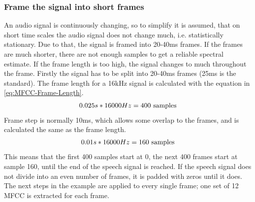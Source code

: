 \subsubsection{Frame the signal into short frames}
An audio signal is continuously changing, so to simplify it is assumed, that on short time scales the audio signal does not change much, i.e. statistically stationary. Due to that, the signal is framed into 20-40ms frames. If the frames are much shorter, there are not enough samples to get a reliable spectral estimate. If the frame length is too high, the signal changes to much throughout the frame.
\newline 
\newline
Firstly the signal has to be split into 20-40ms frames (25ms is the standard). The frame length for a 16kHz signal is calculated with the equation in \ref{eq:MFCC-Frame-Length}. 
\begin{equation}
    \centering
    0.025s * 16000Hz = 400 \ \text{samples}
    \label{eq:MFCC-Frame-Length}
\end{equation}
Frame step is normally 10ms, which allows some overlap to the frames, and is calculated the same as the frame length.
\begin{equation}
    \centering
    0.01s * 16000Hz = 160 \ \text{samples}
    \label{eq:MFCC-Frame-Step}
\end{equation}
This means that the first 400 samples start at 0, the next 400 frames start at sample 160, until the end of the speech signal is reached. If the speech signal does not divide into an even number of frames, it is padded with zeros until it does. The next steps in the example are applied to every single frame; one set of 12 \gls{MFCC} is extracted for each frame.

